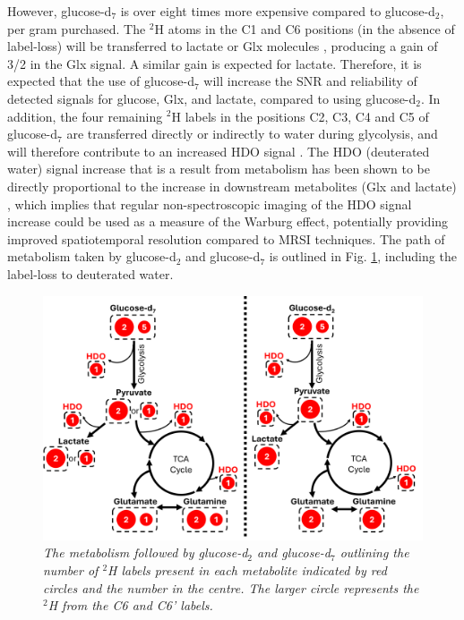 However, glucose-d$_7$ is over eight times more expensive compared to glucose-d$_2$, per gram purchased. The $^2$H atoms in the C1 and C6 positions (in the absence of label-loss) will be transferred to lactate or Glx molecules \cite{DeFeyter2020DeuteriumBrain}, producing a gain of 3/2 in the Glx signal. A similar gain is expected for lactate. Therefore, it is expected that the use of glucose-d$_7$ will increase the \ac{SNR} and reliability of detected signals for glucose, Glx, and lactate, compared to using glucose-d$_2$. In addition, the four remaining $^2$H labels in the positions C2, C3, C4 and C5 of glucose-d$_7$ are transferred directly or indirectly to water during glycolysis, and will therefore contribute to an increased \ac{HDO} signal \cite{Mahar2020HDOMetabolism, Mahar2021DeuteratedGlucose}. The \ac{HDO} (deuterated water) signal increase that is a result from metabolism has been shown to be directly proportional to the increase in downstream metabolites (Glx and lactate) \cite{Mahar2021DeuteratedGlucose}, which implies that regular non-spectroscopic imaging of the \ac{HDO} signal increase could be used as a measure of the Warburg effect, potentially providing improved spatiotemporal resolution compared to \ac{MRSI} techniques. The path of metabolism taken by glucose-d$_2$ and glucose-d$_7$ is outlined in Fig. \ref{fig:Glu:Krebs}, including the label-loss to deuterated water.

\begin{figure}
    \centering
    \includegraphics[width = 1\textwidth]{Figures/Glucose/Krebs.png}
    \caption{\textit{The metabolism followed by glucose-d$_2$ and glucose-d$_7$ outlining the number of $^2$H labels present in each metabolite indicated by red circles and the number in the centre. The larger circle represents the $^2$H from the C6 and C6' labels.}}
    \label{fig:Glu:Krebs}
\end{figure}

